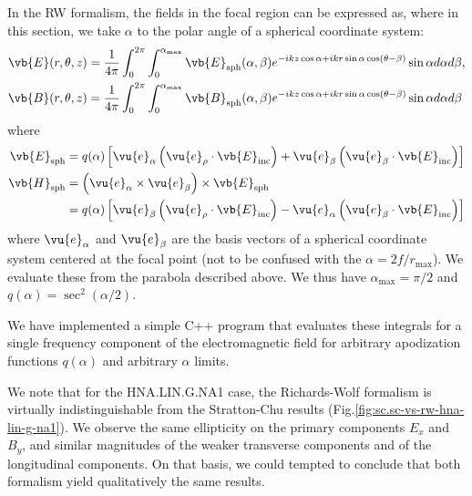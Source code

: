 \documentclass[11pt,SymmetricalJury]{inrsthesis/inrsthesis}
\begin{document}
In the RW formalism, the fields in the focal region can be expressed as, where
in this section, we take $\alpha$ to the polar angle of a spherical coordinate
system\cite{April2012}:
  \begin{align}
    \vb{E}(r,\theta,z) &= \frac{1}{4\pi}\int_0^{2\pi}\int_0^{\alpha_\text{max}}
        \vb{E}_\text{sph}(\alpha,\beta)e^{-ikz\cos\alpha+ikr\sin\alpha\cos(\theta-\beta)}
        \sin\alpha d\alpha d\beta, \\
    \vb{B}(r,\theta,z) &= \frac{1}{4\pi}\int_0^{2\pi}\int_0^{\alpha_\text{max}}
        \vb{B}_\text{sph}(\alpha,\beta)e^{-ikz\cos\alpha+ikr\sin\alpha\cos(\theta-\beta)}
        \sin\alpha d\alpha d\beta
  \end{align}
where
  \begin{align}
    \vb{E}_\text{sph} &= q(\alpha)\left[\vu{e}_\alpha\left(\vu{e}_\rho\cdot\vb{E}_\text{inc}\right)
                                       +\vu{e}_\beta\left(\vu{e}_\beta\cdot\vb{E}_\text{inc}\right)
                                       \right] \\
    \vb{H}_\text{sph} &= \left(\vu{e}_\alpha\times\vu{e}_\beta\right)\times\vb{E}_\text{sph}\nonumber\\
                      &= q(\alpha) \left[\vu{e}_\beta\left(\vu{e}_\rho\cdot\vb{E}_\text{inc}\right)
                                        -\vu{e}_\alpha\left(\vu{e}_\beta\cdot\vb{E}_\text{inc}\right)
                                        \right]
  \end{align}
where $\vu{e}_\alpha$ and $\vu{e}_\beta$ are the basis vectors of a spherical
coordinate system centered at the focal point (not to be confused with the
$\alpha=2f/r_\text{max}$). We evaluate these from the parabola described above.
We thus have $\alpha_\text{max}=\pi/2$ and $q(\alpha)=\sec^2(\alpha/2)$.

We have implemented a simple C++ program that evaluates these integrals for a
single frequency component of the electromagnetic field for arbitrary
apodization functions $q(\alpha)$ and arbitrary $\alpha$ limits.


We note that for the HNA.LIN.G.NA1 case, the Richards-Wolf formalism is
virtually indistinguishable from the Stratton-Chu results
(Fig.\ref{fig:sc.sc-vs-rw-hna-lin-g-na1}). We observe the same ellipticity on
the primary components $E_x$ and $B_y$, and similar magnitudes of the weaker
transverse components and of the longitudinal components. On that basis, we
could tempted to conclude that both formalism yield qualitatively the same
results.
\end{document}

